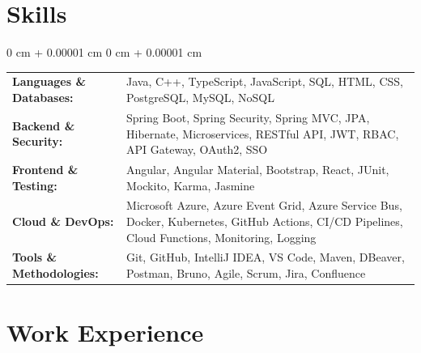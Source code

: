 \documentclass[10pt, letterpaper]{article}
\newenvironment{onecolentry}{
    \begin{adjustwidth}{
        0 cm + 0.00001 cm
    }{
        0 cm + 0.00001 cm
    }
}{
    \end{adjustwidth}
}
\begin{document}
\section{Skills}
\begin{onecolentry}
\begin{tabularx}{\textwidth}{@{} l X @{}}
    \textbf{Languages \& Databases:}  & Java, C++, TypeScript, JavaScript, SQL, HTML, CSS, PostgreSQL, MySQL, NoSQL \\
    \textbf{Backend \& Security:}     & Spring Boot, Spring Security, Spring MVC, JPA, Hibernate, Microservices, RESTful API, JWT, RBAC, API Gateway, OAuth2, SSO \\
    \textbf{Frontend \& Testing:}     & Angular, Angular Material, Bootstrap, React, JUnit, Mockito, Karma, Jasmine \\
    \textbf{Cloud \& DevOps:}         & Microsoft Azure, Azure Event Grid, Azure Service Bus, Docker, Kubernetes, GitHub Actions, CI/CD Pipelines, Cloud Functions, Monitoring, Logging \\
    \textbf{Tools \& Methodologies:}  & Git, GitHub, IntelliJ IDEA, VS Code, Maven, DBeaver, Postman, Bruno, Agile, Scrum, Jira, Confluence \\
\end{tabularx}
\end{onecolentry}

\section{Work Experience}

\vspace{0.05 cm}
\end{document}
